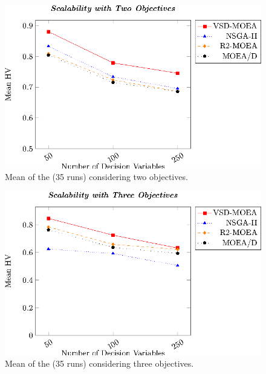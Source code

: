\begin{figure}[t]
\centering
\includegraphics[]{Images/Graphic-Scalability-2obj_tikz-figure0.eps}
%
\caption{Mean of the \HV{} (35 runs) considering two objectives.}\label{fig:variable-decision-scalability-2obj}
\end{figure}

\begin{figure}[t]
\centering
\includegraphics[]{Images/Graphic-Scalability-3obj_tikz-figure0.eps}
%
\caption{Mean of the \HV{} (35 runs) considering three objectives.} \label{fig:variable-decision-scalability-3obj}
\end{figure}


